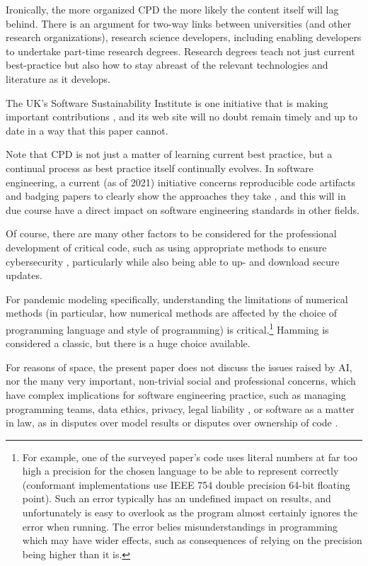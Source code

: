 \documentclass[10pt,a4paper]{article}
\begin{document}
Ironically, the more organized CPD the more likely the content itself will lag behind. There is an argument for two-way links between universities (and other research organizations), research science developers, including enabling developers to undertake part-time research degrees. Research degrees teach not just current best-practice but also how to stay abreast of the relevant technologies and literature as it develops.

The UK's Software Sustainability Institute is one initiative that is making important contributions \cite{ssi-report,ssi-url}, and its web site will no doubt remain timely and up to date in a way that this paper cannot.

Note that CPD is not just a matter of learning current best practice, but a continual process as best practice itself continually evolves. {In software engineering, a current (as of 2021) initiative concerns reproducible code artifacts and badging papers to clearly show the approaches they take \cite{acm-artifacts}, and this will in due course have a direct impact on software engineering standards in other fields.}

Of course, there are many other factors to be considered for the professional development of critical code, such as using appropriate methods to ensure cybersecurity \cite{security-engineering,cyber-cacm}, particularly while also being able to up- and download secure updates.

For pandemic modeling specifically, understanding the limitations of numerical methods (in particular, how numerical methods are affected by the choice of programming language and style of programming) is critical.\footnote{{For example, one of the surveyed paper's code \cite{example-numerical-error} uses literal numbers at far too high a precision for the chosen language to be able to represent correctly (conformant implementations use IEEE 754 double precision 64-bit floating point). Such an error typically has an undefined impact on results, and unfortunately is easy to overlook as the program almost certainly ignores the error when running. The error belies misunderstandings in programming which may have wider effects, such as consequences of relying on the precision being higher than it is.}} Hamming \cite{hamming} is considered a classic, but there is a huge choice available.

{For reasons of space, the present paper does not discuss the issues raised by AI, nor the many very important, non-trivial social and professional concerns, which have complex implications for software engineering practice, such as managing programming teams, data ethics, privacy, legal liability \cite{Schneier}, or software as a matter in law, as in disputes over model results or disputes over ownership of code \cite{electronic-evidence}.}
\end{document}
